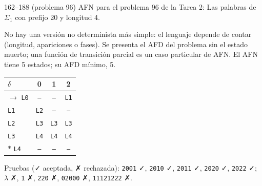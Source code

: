 \documentclass[11pt]{article}
\begin{document}
\begin{ejercicio}{162--188 (problema 96)}{}
AFN para el problema 96 de la Tarea 2: Las palabras de $\Sigma_1$ con prefijo 20 y longitud 4.
\end{ejercicio}
\proc No hay una versión no determinista más simple: el lenguaje depende de contar (longitud, apariciones o fases). Se presenta el AFD del problema sin el estado muerto; una función de transición parcial es un caso particular de AFN. El AFN tiene 5 estados; su AFD mínimo, 5.
\begin{center}\small\begin{tabular}{lccc}\toprule
$\delta$ & 0 & 1 & 2 \\\midrule
$\to$ \texttt{L0} & \texttt{--} & \texttt{--} & \texttt{L1} \\
 \texttt{L1} & \texttt{L2} & \texttt{--} & \texttt{--} \\
 \texttt{L2} & \texttt{L3} & \texttt{L3} & \texttt{L3} \\
 \texttt{L3} & \texttt{L4} & \texttt{L4} & \texttt{L4} \\
$*$ \texttt{L4} & \texttt{--} & \texttt{--} & \texttt{--} \\
\bottomrule\end{tabular}\end{center}
Pruebas (✓ aceptada, ✗ rechazada): \texttt{2001} ✓, \texttt{2010} ✓, \texttt{2011} ✓, \texttt{2020} ✓, \texttt{2022} ✓; $\lambda$ ✗, \texttt{1} ✗, \texttt{220} ✗, \texttt{02000} ✗, \texttt{11121222} ✗.
\end{document}
